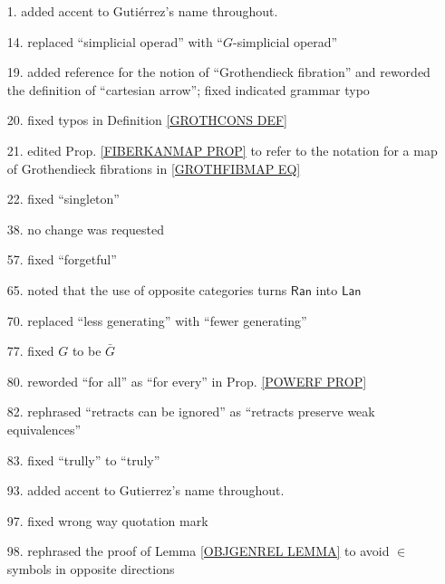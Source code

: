 \documentclass{article}
\begin{document}
\begin{itemize}
\item[1.] added accent to Guti\'{e}rrez's name throughout.

\item[14.] replaced ``simplicial operad'' with  ``$G$-simplicial operad''

\item[19.] added reference for the notion of ``Grothendieck fibration'' and reworded the definition of ``cartesian arrow''; fixed indicated grammar typo

\item[20.] fixed typos in Definition \ref{GROTHCONS DEF}

\item[21.] edited Prop. \ref{FIBERKANMAP PROP} to refer to the notation for a map of Grothendieck fibrations in \eqref{GROTHFIBMAP EQ}

\item[22.] fixed ``singleton''

\item[38.] no change was requested

\item[57.] fixed ``forgetful''

\item[65.] noted that the use of opposite categories turns $\mathsf{Ran}$ into $\mathsf{Lan}$

\item[70.] replaced ``less generating'' with ``fewer generating''

\item[77.] fixed $G$ to be $\bar{G}$

\item[80.] reworded ``for all'' as ``for every'' in Prop. \ref{POWERF PROP}

\item[82.] rephrased ``retracts can be ignored''
as ``retracts preserve weak equivalences''

\item[83.] fixed ``trully'' to ``truly''

\item[93.] added accent to Gutierrez's name throughout.

\item[97.] fixed wrong way quotation mark

\item[98.] rephrased the proof of Lemma \ref{OBJGENREL LEMMA}
to avoid $\in$ symbols in opposite directions

\end{itemize}








{}


\end{document}
